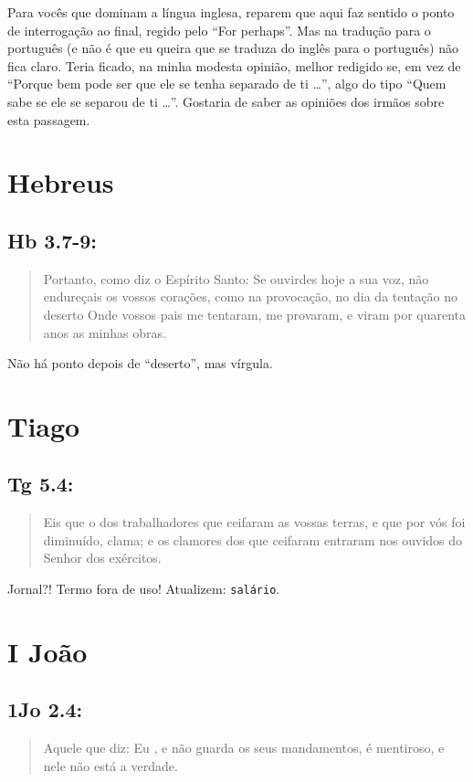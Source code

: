 Para vocês que dominam a língua inglesa, reparem que aqui faz sentido o ponto de interrogação ao final, regido pelo ``For perhaps''. Mas na tradução para o português (e não é que eu queira que se traduza do inglês para o português) não fica claro. Teria ficado, na minha modesta opinião, melhor redigido se, em vez de ``Porque bem pode ser que ele se tenha separado de ti \ldots{}'', algo do tipo ``Quem sabe se ele se separou de ti \ldots{}''. Gostaria de saber as opiniões dos irmãos sobre esta passagem.

\section{Hebreus}
\subsection*{Hb 3.7-9:}
\begin{quote}
    \small
Portanto, como diz o Espírito Santo: Se ouvirdes hoje a sua voz, não endureçais os vossos corações, como na provocação, no dia da tentação no deserto Onde vossos pais me tentaram, me provaram, e viram por quarenta anos as minhas obras.
\end{quote}

Não há ponto depois de ``deserto'', mas vírgula.

\section{Tiago}
\subsection*{Tg 5.4:}
\begin{quote}
    \small
Eis que o  dos trabalhadores que ceifaram as vossas terras, e que por vós foi diminuído, clama; e os clamores dos que ceifaram entraram nos ouvidos do Senhor dos exércitos.
\end{quote}

Jornal?! Termo fora de uso! Atualizem: \texttt{salário}.

\section{I João}
\subsection*{1Jo 2.4:}
\begin{quote}
    \small
Aquele que diz: Eu , e não guarda os seus mandamentos, é mentiroso, e nele não está a verdade.
\end{quote}


